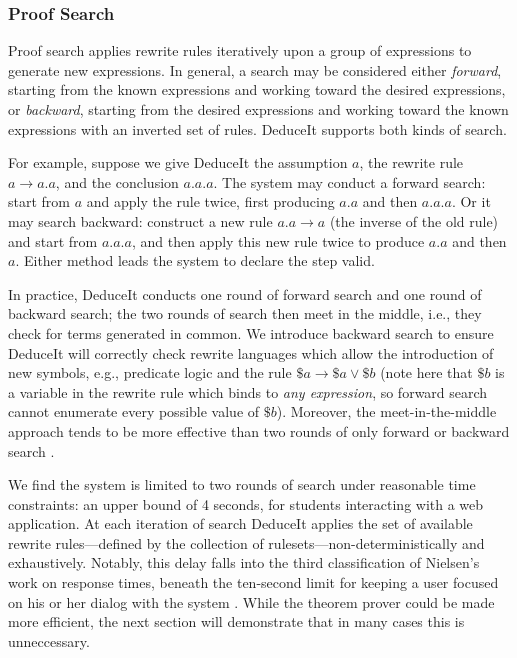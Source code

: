 \documentclass{sigchi}
\begin{document}
\subsubsection{Proof Search}

Proof search applies rewrite rules iteratively upon a group of expressions to generate new expressions. In general, a search may be considered either \textit{forward}, starting from the known expressions and working toward the desired expressions, or \textit{backward}, starting from the desired expressions and working toward the known expressions with an inverted set of rules. DeduceIt supports both kinds of search. 

For example, suppose we give DeduceIt the assumption $a$, the rewrite rule $a \rightarrow a.a$, and the conclusion $a.a.a$. The system may conduct a forward search: start from $a$ and apply the rule twice, first producing $a.a$ and then $a.a.a$. Or it may search backward: construct a new rule $a.a \rightarrow a$ (the inverse of the old rule) and start from $a.a.a$, and then apply this new rule twice to produce $a.a$ and then $a$. Either method leads the system to declare the step valid.

In practice, DeduceIt conducts one round of forward search and one round of backward search; the two rounds of search then meet in the middle, i.e., they check for terms generated in common. We introduce backward search to ensure DeduceIt will correctly check rewrite languages which allow the introduction of new symbols, e.g., predicate logic and the rule $\$a \rightarrow \$a \vee \$b$ (note here that $\$b$ is a variable in the rewrite rule which binds to \textit{any expression}, so forward search cannot enumerate every possible value of $\$b$). Moreover, the meet-in-the-middle approach tends to be more effective than two rounds of only forward or backward search \cite{bisearch}.

We find the system is limited to two rounds of search under reasonable time constraints: an upper bound of 4 seconds, for students interacting with a web application. At each iteration of search DeduceIt applies the set of available rewrite rules---defined by the collection of rulesets---non-deterministically and exhaustively. Notably, this delay falls into the third classification of Nielsen's work on response times, beneath the ten-second limit for keeping a user focused on his or her dialog with the system \cite{neilsen}. While the theorem prover could be made more efficient, the next section will demonstrate that in many cases this is unneccessary.
\end{document}
